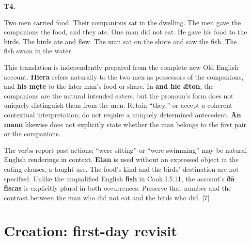 \par\begin{minipage}{\linewidth}\raggedright
\textbf{T4.}

Two men carried food. Their companions sat in the dwelling. The men gave the companions the food, and they ate. One man did not eat. He gave his food to the birds. The birds ate and flew. The man sat on the shore and saw the fish. The fish swam in the water.

This translation is independently prepared from the complete new Old English account. \textbf{Hiera} refers naturally to the two men as possessors of the companions, and \textbf{his męte} to the later man's food or share. In \textbf{and hīe ǣton}, the companions are the natural intended eaters, but the pronoun's form does not uniquely distinguish them from the men. Retain “they,” or accept a coherent contextual interpretation; do not require a uniquely determined antecedent. \textbf{Ān mann} likewise does not explicitly state whether the man belongs to the first pair or the companions.

The verbs report past actions; “were sitting” or “were swimming” may be natural English renderings in context. \textbf{Etan} is used without an expressed object in the eating clauses, a taught use. The food's kind and the birds' destination are not specified. Unlike the unqualified English \textbf{fish} in Cook I.5.11, the account's \textbf{ðā fiscas} is explicitly plural in both occurrences. Preserve that number and the contrast between the man who did not eat and the birds who did. [7]

\end{minipage}\par\addvspace{4pt}

\section*{Creation: first-day revisit}

